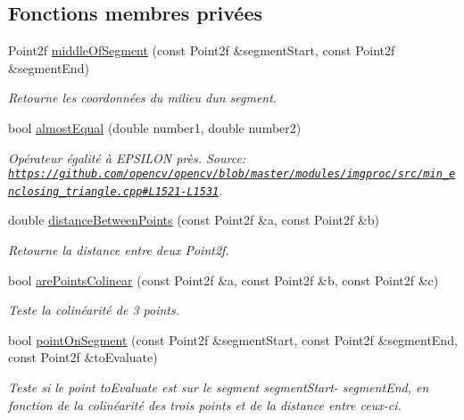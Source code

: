 \subsection*{Fonctions membres privées}
\begin{DoxyCompactItemize}
\item 
Point2f \hyperlink{classKippi_a5192ea964167634b40c1938b332bdb9f}{middle\+Of\+Segment} (const Point2f \&segment\+Start, const Point2f \&segment\+End)
\begin{DoxyCompactList}\small\item\em Retourne les coordonnées du milieu d\textquotesingle{}un segment. \end{DoxyCompactList}\item 
bool \hyperlink{classKippi_a6631ea0c01edea1b06f87b27f79c667a}{almost\+Equal} (double number1, double number2)
\begin{DoxyCompactList}\small\item\em Opérateur égalité à E\+P\+S\+I\+L\+ON près. Source\+: \href{https://github.com/opencv/opencv/blob/master/modules/imgproc/src/min_enclosing_triangle.cpp#L1521-L1531}{\tt https\+://github.\+com/opencv/opencv/blob/master/modules/imgproc/src/min\+\_\+enclosing\+\_\+triangle.\+cpp\#\+L1521-\/\+L1531}. \end{DoxyCompactList}\item 
double \hyperlink{classKippi_a0e3cbabe915e2be9e8ab37081d7098ed}{distance\+Between\+Points} (const Point2f \&a, const Point2f \&b)
\begin{DoxyCompactList}\small\item\em Retourne la distance entre deux Point2f. \end{DoxyCompactList}\item 
bool \hyperlink{classKippi_aa0e06b53305f73af6cd8be09bad0c647}{are\+Points\+Colinear} (const Point2f \&a, const Point2f \&b, const Point2f \&c)
\begin{DoxyCompactList}\small\item\em Teste la colinéarité de 3 points. \end{DoxyCompactList}\item 
bool \hyperlink{classKippi_a8766f581808019895b8a515e18550347}{point\+On\+Segment} (const Point2f \&segment\+Start, const Point2f \&segment\+End, const Point2f \&to\+Evaluate)
\begin{DoxyCompactList}\small\item\em Teste si le point to\+Evaluate est sur le segment segment\+Start-\/ segment\+End, en fonction de la colinéarité des trois points et de la distance entre ceux-\/ci. \end{DoxyCompactList}\item 

\end{DoxyCompactItemize}
